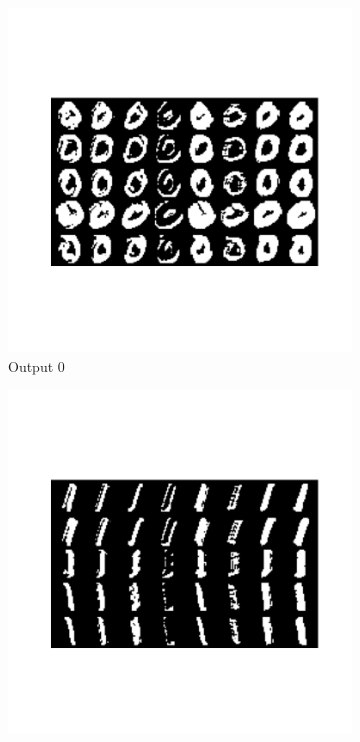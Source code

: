 \documentclass{assignment}
\begin{document}
\begin{figure}[!htb]
    \begin{subfigure}{0.3\textwidth}
        \includegraphics[width=\textwidth]{figures/out_0.png}
        \caption{Output 0}
    \end{subfigure}\hfill
    \begin{subfigure}{0.3\textwidth}
        \includegraphics[width=\textwidth]{figures/out_1.png}

\end{subfigure}
\end{figure}
\end{document}

